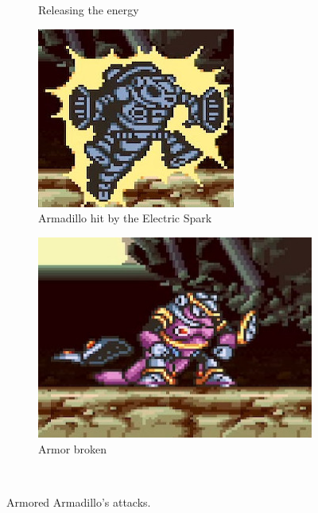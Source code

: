 \begin{figure}[htp]
\begin{subfigure}{0.42\textwidth}
		\caption{Releasing the energy}
	\end{subfigure}
	\begin{subfigure}[t]{0.4\textwidth}
		\centering
		\includegraphics[width=\linewidth]{figures/X1/Armored_armadillo/Armadillo_shock_1.jpg}
		\caption{Armadillo hit by the Electric Spark}
	\end{subfigure}
	\begin{subfigure}[t]{0.4\textwidth}
		\centering
		\includegraphics[width=\linewidth]{figures/X1/Armored_armadillo/Armadillo_shock_2.jpg}
		\caption{Armor broken}
	\end{subfigure}\\
	\caption{Armored Armadillo's attacks.}
\end{figure}

